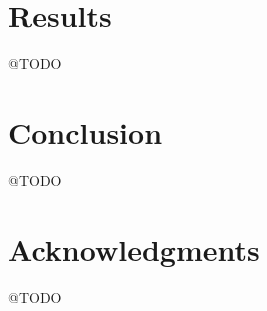 \documentclass[a4paper,11pt,abstracton,hidelinks]{scrartcl}
\begin{document}
\section{Results}


@TODO


\section{Conclusion}


@TODO


\section{Acknowledgments}


@TODO


\printbibliography
\end{document}
